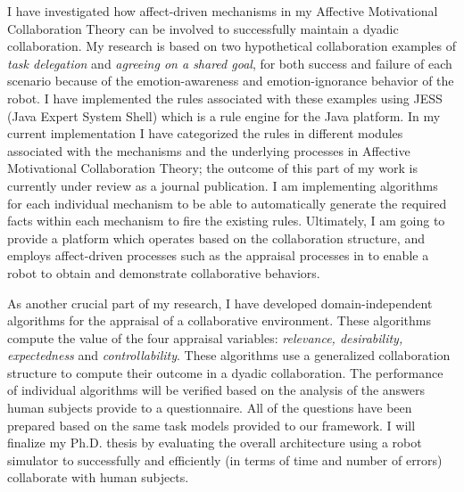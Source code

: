 \documentclass[a4paper, 11pt]{article}
\begin{document}
\begin{small}
I have investigated how affect-driven mechanisms in my Affective Motivational
Collaboration Theory can be involved to successfully maintain a dyadic
collaboration. My research is based on two hypothetical collaboration examples
of \textit{task delegation} and \textit{agreeing on a shared goal}, for both
success and failure of each scenario because of the emotion-awareness and
emotion-ignorance behavior of the robot. I have implemented the rules associated
with these examples using JESS (Java Expert System Shell) which is a rule engine
for the Java platform. In my current implementation I have categorized the rules
in different modules associated with the mechanisms and the underlying processes
in Affective Motivational Collaboration Theory; the outcome of this part of my
work is currently under review as a journal publication. I am implementing
algorithms for each individual mechanism to be able to automatically generate
the required facts within each mechanism to fire the existing rules. Ultimately,
I am going to provide a platform which operates based on the collaboration
structure, and employs affect-driven processes such as the appraisal processes
in \cite{marsella:ema-process-model} to enable a robot to obtain and demonstrate
collaborative behaviors.


As another crucial part of my research, I have developed domain-independent
algorithms for the appraisal of a collaborative environment. These algorithms
compute the value of the four appraisal variables: \textit{relevance,
desirability, expectedness} and \textit{controllability}. These algorithms use a
generalized collaboration structure to compute their outcome in a dyadic
collaboration. The performance of individual algorithms will be verified based
on the analysis of the answers human subjects provide to a questionnaire. All
of the questions have been prepared based on the same task models provided to
our framework. I will finalize my Ph.D. thesis by evaluating the overall
architecture using a robot simulator to successfully and efficiently (in terms
of time and number of errors) collaborate with human subjects.
\vspace*{-5mm}

\end{small}
\end{document}

